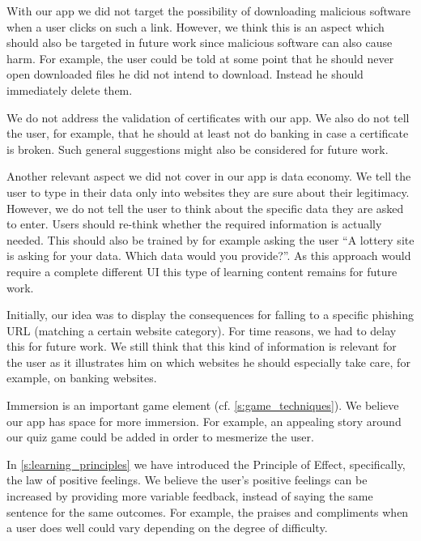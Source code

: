 \begin{description}[leftmargin=0cm]
	\item[Malicious Downloads:] With our app we did not target the possibility of downloading malicious software when a user clicks on such a link.
	However, we think this is an aspect which should also be targeted in future work since malicious software can also cause harm.
	For example, the user could be told at some point that he should never open downloaded files he did not intend to download.
	Instead he should immediately delete them.
	\item[Certificate Validation:] We do not address the validation of certificates with our app. We also do not tell the user, for example, that he should at least not do banking in case a certificate is broken.
	Such general suggestions might also be considered for future work.
	\item[Data Economy:] Another relevant aspect we did not cover in our app is data economy.
	We tell the user to type in their data only into websites they are sure about their legitimacy.
	However, we do not tell the user to think about the specific data they are asked to enter.
	Users should re-think whether the required information is actually needed.
	This should also be trained by for example asking the user ``A lottery site is asking for your data. Which data would you provide?''. As this approach would require a complete different UI this type of learning content remains for future work.
	\item[Consequences:] Initially, our idea was to display the consequences for falling to a specific phishing URL (matching a certain website category). For time reasons, we had to delay this for future work.
	We still think that this kind of information is relevant for the user as it illustrates him on which websites he should especially take care, for example, on banking websites.
	\item[Increase Immersion:] Immersion is an important game element (cf. \autoref{s:game_techniques}).
	We believe our app has space for more immersion. 
	For example, an appealing story around our quiz game could be added in order to mesmerize the user.
	\item[Increase Effect:] In \autoref{s:learning_principles} we have introduced the Principle of Effect, specifically, the law of positive feelings. 
	We believe the user's positive feelings can be increased by providing more variable feedback, instead of saying the same sentence for the same outcomes.
	For example, the praises and compliments when a user does well could vary depending on the degree of difficulty.

\end{description}
